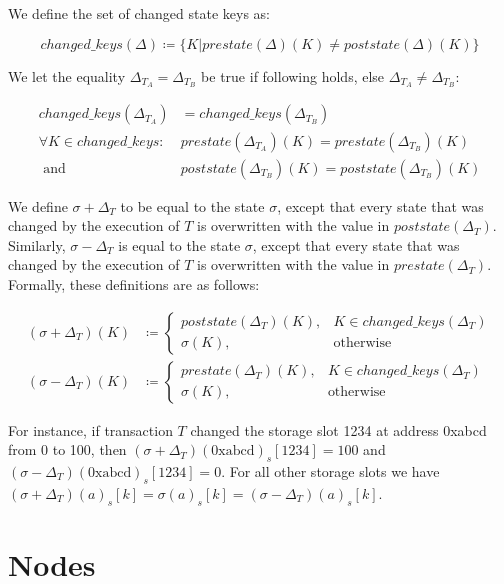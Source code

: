 \documentclass[draft,final]{vutinfth} %
\begin{document}
We define the set of changed state keys as:

$$changed\_keys(\Delta) \coloneqq \{ K | prestate(\Delta)(K) \neq poststate(\Delta)(K) \}$$

We let the equality $\Delta_{T_A} = \Delta_{T_B}$ be true if following holds, else $\Delta_{T_A} \neq \Delta_{T_B}$:

\begin{align*}
    changed\_keys(\Delta_{T_A})       & = changed\_keys(\Delta_{T_B})                           \\
    \forall K \in changed\_keys\colon &
    prestate(\Delta_{T_A})(K) = prestate(\Delta_{T_B})(K)                                       \\
    \text{ and }                      & poststate(\Delta_{T_B})(K) = poststate(\Delta_{T_B})(K)
\end{align*}

We define $\sigma + \Delta_T$ to be equal to the state $\sigma$, except that every state that was changed by the execution of $T$ is overwritten with the value in $poststate(\Delta_T)$. Similarly, $\sigma - \Delta_T$ is equal to the state $\sigma$, except that every state that was changed by the execution of $T$ is overwritten with the value in $prestate(\Delta_T)$. Formally, these definitions are as follows:

\begin{align*}
    (\sigma + \Delta_T)(K) & \coloneqq
    \begin{cases}
        poststate(\Delta_T)(K), & K \in changed\_keys(\Delta_T) \\
        \sigma(K),              & \text{otherwise}
    \end{cases} \\
    (\sigma - \Delta_T)(K) & \coloneqq
    \begin{cases}
        prestate(\Delta_T)(K), & K \in changed\_keys(\Delta_T) \\
        \sigma(K),             & \text{otherwise}
    \end{cases}
\end{align*}

For instance, if transaction $T$ changed the storage slot 1234 at address 0xabcd from 0 to 100, then $(\sigma + \Delta_T)(\text{0xabcd})_s[1234] = 100$ and $(\sigma - \Delta_T)(\text{0xabcd})_s[1234] = 0$. For all other storage slots we have $(\sigma + \Delta_T)(a)_s[k] = \sigma(a)_s[k] = (\sigma - \Delta_T)(a)_s[k]$.

\section{Nodes}
\end{document}
